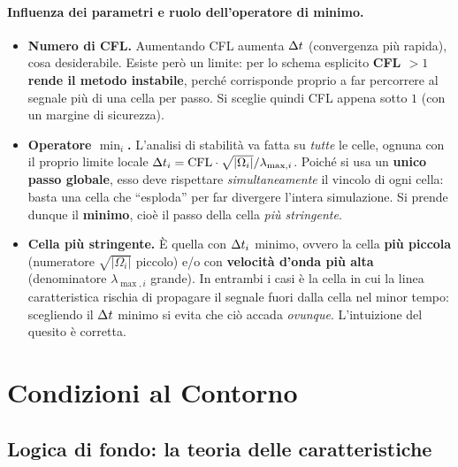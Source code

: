 \paragraph{Influenza dei parametri e ruolo dell'operatore di minimo.}
\begin{itemize}
  \item \textbf{Numero di CFL.} Aumentando CFL aumenta $\Delta t$ (convergenza più rapida),
    cosa desiderabile. Esiste però un limite: per lo schema esplicito \textbf{CFL $>1$
    rende il metodo instabile}, perché corrisponde proprio a far percorrere al segnale
    più di una cella per passo. Si sceglie quindi CFL appena sotto $1$ (con un margine
    di sicurezza).
  \item \textbf{Operatore $\min_i$.} L'analisi di stabilità va fatta su \emph{tutte} le
    celle, ognuna con il proprio limite locale
    $\Delta t_i = \text{CFL}\cdot\sqrt{|\Omega_i|}/\lambda_{\max,i}$. Poiché si usa un
    \textbf{unico passo globale}, esso deve rispettare \emph{simultaneamente} il
    vincolo di ogni cella: basta una cella che ``esploda'' per far divergere l'intera
    simulazione. Si prende dunque il \textbf{minimo}, cioè il passo della cella
    \emph{più stringente}.
  \item \textbf{Cella più stringente.} È quella con $\Delta t_i$ minimo, ovvero la cella
    \textbf{più piccola} (numeratore $\sqrt{|\Omega_i|}$ piccolo) e/o con
    \textbf{velocità d'onda più alta} (denominatore $\lambda_{\max,i}$ grande). In
    entrambi i casi è la cella in cui la linea caratteristica rischia di propagare il
    segnale fuori dalla cella nel minor tempo: scegliendo il $\Delta t$ minimo si evita che
    ciò accada \emph{ovunque}. L'intuizione del quesito è corretta.
\end{itemize}

\section{Condizioni al Contorno}

\subsection{Logica di fondo: la teoria delle caratteristiche}


